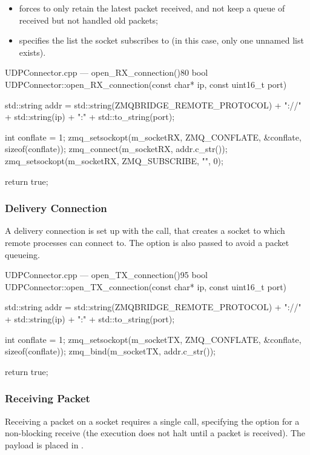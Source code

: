 \begin{itemize}
	\item {} forces  to only retain the latest \gls{packet} received, and not keep a queue of received but not handled old \glspl{packet};
	\item {} specifies the list the socket subscribes to (in this case, only one unnamed list exists).
\end{itemize}

\begin{codelist}{UDPConnector.cpp --- open\_RX\_connection()}{80}
bool UDPConnector::open_RX_connection(const char* ip, const uint16_t port) {

	std::string addr = std::string(ZMQBRIDGE_REMOTE_PROTOCOL) + "://" + std::string(ip) + ":" + std::to_string(port);

	int conflate = 1;
	zmq_setsockopt(m_socketRX, ZMQ_CONFLATE, &conflate, sizeof(conflate));
	zmq_connect(m_socketRX, addr.c_str());
	zmq_setsockopt(m_socketRX, ZMQ_SUBSCRIBE, "", 0);

	return true;
}
\end{codelist}

\subsubsection{Delivery Connection}

A delivery connection is set up with the  call, that creates a socket to which remote  processes can connect to. The  option is also passed to avoid a \gls{packet} queueing.

\begin{codelist}{UDPConnector.cpp --- open\_TX\_connection()}{95}
bool UDPConnector::open_TX_connection(const char* ip, const uint16_t port) {
	std::string addr = std::string(ZMQBRIDGE_REMOTE_PROTOCOL) + "://" + std::string(ip) + ":" + std::to_string(port);

	int conflate = 1;
	zmq_setsockopt(m_socketTX, ZMQ_CONFLATE, &conflate, sizeof(conflate));
	zmq_bind(m_socketTX, addr.c_str());

	return true;
}
\end{codelist}

\subsubsection{Receiving Packet}

Receiving a \gls{packet} on a socket requires a single  call, specifying the  option for a non-blocking receive (the execution does not halt until a \gls{packet} is received). The \gls{payload} is placed in .


